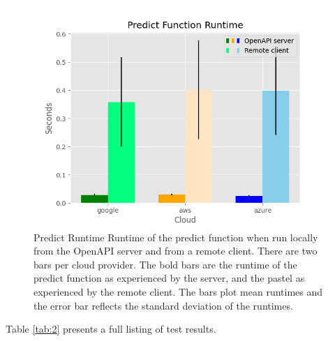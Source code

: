 \begin{figure}
\centering
\includegraphics[width=\columnwidth]{../images/sample_graph_4.png}
\caption{Predict Runtime Runtime of the predict function when run locally from
the OpenAPI server and from a remote client. There are two bars per
cloud provider. The bold bars are the runtime of the predict function as
experienced by the server, and the pastel as experienced by the remote
client. The bars plot mean runtimes and the error bar reflects the
standard deviation of the runtimes.}
\label{fig:predict}
\end{figure}

Table \ref{tab:2} presents a full listing of test results.

